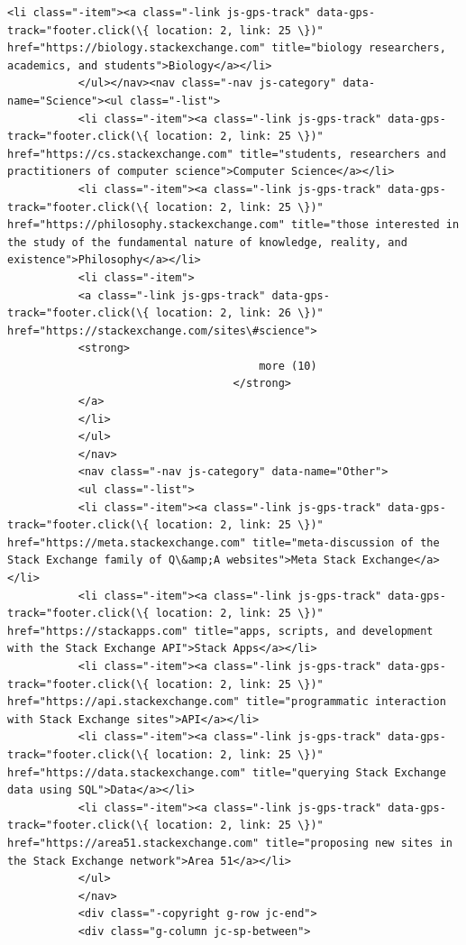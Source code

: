 \documentclass[11pt]{article}
\begin{document}
\begin{Verbatim}[commandchars=\\\{\}]
           <li class="-item"><a class="-link js-gps-track" data-gps-track="footer.click(\{ location: 2, link: 25 \})" href="https://biology.stackexchange.com" title="biology researchers, academics, and students">Biology</a></li>
           </ul></nav><nav class="-nav js-category" data-name="Science"><ul class="-list">
           <li class="-item"><a class="-link js-gps-track" data-gps-track="footer.click(\{ location: 2, link: 25 \})" href="https://cs.stackexchange.com" title="students, researchers and practitioners of computer science">Computer Science</a></li>
           <li class="-item"><a class="-link js-gps-track" data-gps-track="footer.click(\{ location: 2, link: 25 \})" href="https://philosophy.stackexchange.com" title="those interested in the study of the fundamental nature of knowledge, reality, and existence">Philosophy</a></li>
           <li class="-item">
           <a class="-link js-gps-track" data-gps-track="footer.click(\{ location: 2, link: 26 \})" href="https://stackexchange.com/sites\#science">
           <strong>
                                       more (10)
                                   </strong>
           </a>
           </li>
           </ul>
           </nav>
           <nav class="-nav js-category" data-name="Other">
           <ul class="-list">
           <li class="-item"><a class="-link js-gps-track" data-gps-track="footer.click(\{ location: 2, link: 25 \})" href="https://meta.stackexchange.com" title="meta-discussion of the Stack Exchange family of Q\&amp;A websites">Meta Stack Exchange</a></li>
           <li class="-item"><a class="-link js-gps-track" data-gps-track="footer.click(\{ location: 2, link: 25 \})" href="https://stackapps.com" title="apps, scripts, and development with the Stack Exchange API">Stack Apps</a></li>
           <li class="-item"><a class="-link js-gps-track" data-gps-track="footer.click(\{ location: 2, link: 25 \})" href="https://api.stackexchange.com" title="programmatic interaction with Stack Exchange sites">API</a></li>
           <li class="-item"><a class="-link js-gps-track" data-gps-track="footer.click(\{ location: 2, link: 25 \})" href="https://data.stackexchange.com" title="querying Stack Exchange data using SQL">Data</a></li>
           <li class="-item"><a class="-link js-gps-track" data-gps-track="footer.click(\{ location: 2, link: 25 \})" href="https://area51.stackexchange.com" title="proposing new sites in the Stack Exchange network">Area 51</a></li>
           </ul>
           </nav>
           <div class="-copyright g-row jc-end">
           <div class="g-column jc-sp-between">

\end{Verbatim}
\end{document}
